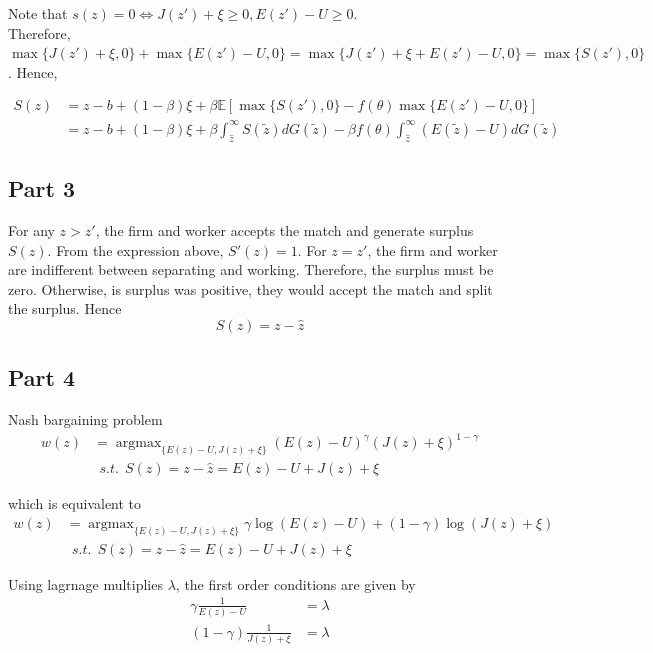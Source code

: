 Note that $s(z) = 0 \iff J(z')+\xi\ge 0, E(z')-U \ge 0$.\\ Therefore, $\max\{J(z')+\xi, 0\} +  \max\{E(z')-U, 0\} = \max\{J(z')+\xi + E(z')-U, 0\} = \max\{S(z'), 0\}$. Hence, 

\begin{align*}
    S(z) &= z -b + (1-\beta) \xi + \beta \mathbb E \left[ \max\{S(z'), 0\} - f(\theta)\max\{E(z')-U, 0\} \right]\\
    &= z -b + (1-\beta) \xi + \beta \int_{\hat z}^\infty S(\tilde z)dG(\tilde z) - \beta f(\theta) \int_{\hat z}^\infty (E(\tilde z) - U)dG(\tilde z) \tag{1-1}
\end{align*}

\subsection*{Part 3}
For any $z>z'$, the firm and worker accepts the match and generate surplus $S(z)$. From the expression above, $S'(z) = 1$. For $z=z'$, the firm and worker are indifferent between separating and working. Therefore, the surplus must be zero. Otherwise, is surplus was positive, they would accept the match and split the surplus. Hence
$$ S(z) = z - \hat z$$

\subsection*{Part 4}

Nash bargaining problem
\begin{align*}
    w(z) &= \operatorname{argmax}_{\{E(z) - U, J(z) + \xi\}} (E(z) - U)^{\gamma}(J(z) + \xi)^{1-\gamma}\\
        &~~ s.t.~~ S(z) = z-\hat z = E(z) - U + J(z) + \xi
\end{align*}

which is equivalent to 
\begin{align*}
    w(z) &= \operatorname{argmax}_{\{E(z) - U, J(z) + \xi\}} \gamma \log (E(z) - U) + (1-\gamma)\log (J(z) + \xi)\\
        &~~ s.t.~~ S(z) = z-\hat z = E(z) - U + J(z) + \xi
\end{align*}

Using lagrnage multiplies $\lambda$, the first order conditions are given by 
\begin{align*}
    \gamma \frac{1}{E(z) - U} &= \lambda \\
    (1-\gamma) \frac{1}{J(z) + \xi} &= \lambda \\
\end{align*}

